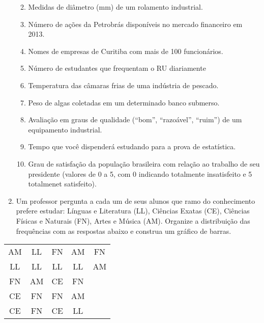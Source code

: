 \documentclass[]{article}
\providecommand{\tightlist}{%
  \setlength{\itemsep}{0pt}\setlength{\parskip}{0pt}}
\begin{document}
\begin{enumerate}
  \begin{enumerate}
  \def\labelenumii{(\alph{enumii})}
  \tightlist
  \item
    Medidas de diâmetro (mm) de um rolamento industrial.
  \item
    Número de ações da Petrobrás disponíveis no mercado financeiro em
    2013.
  \item
    Nomes de empresas de Curitiba com mais de 100 funcionários.
  \item
    Número de estudantes que frequentam o RU diariamente
  \item
    Temperatura das câmaras frias de uma indústria de pescado.
  \item
    Peso de algas coletadas em um determinado banco submerso.
  \item
    Avaliação em graus de qualidade (``bom'', ``razoável'', ``ruim'') de
    um equipamento industrial.
  \item
    Tempo que você dispenderá estudando para a prova de estatística.
  \item
    Grau de satisfação da população brasileira com relação ao trabalho
    de seu presidente (valores de 0 a 5, com 0 indicando totalmente
    insatisfeito e 5 totalmenet satisfeito).
  \end{enumerate}
\item
  Um professor pergunta a cada um de seus alunos que ramo do
  conhecimento prefere estudar: Línguas e Literatura (LL), Ciências
  Exatas (CE), Ciências Físicas e Naturais (FN), Artes e Música (AM).
  Organize a distribuição das frequências com as respostas abaixo e
  construa um gráfico de barras.
\end{enumerate}

\begin{table}[H]
\centering
\begin{tabular}{ccccc}
\hline
AM & LL & FN & AM & FN \\
LL & LL & LL & LL & AM \\
FN & AM & CE & FN &    \\
CE & FN & FN & AM &    \\
CE & FN & CE & LL &    \\ \hline
\end{tabular}
\end{table}
\end{document}
